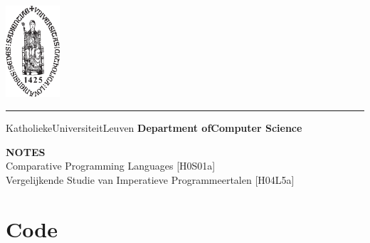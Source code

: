 \documentclass[a4paper]{article}
\begin{document}
\begin{titlepage}
    \newpage
    \thispagestyle{empty}
    \frenchspacing
    \hspace{-0.2cm}
    \includegraphics[height=3.4cm]{assets/sedes}
    \hspace{0.2cm}
    \rule{0.5pt}{3.4cm}
    \hspace{0.2cm}
    \begin{minipage}[b]{8cm}
        \Large{Katholieke\newline Universiteit\newline Leuven}\smallskip\newline
        \large{}\smallskip\newline
        \textbf{Department of\newline Computer Science}\smallskip
    \end{minipage}
    \vspace*{3.2cm}\vfill
    \begin{center}
        \begin{minipage}[t]{\textwidth}
            \begin{center}
                \large{\rm{\textbf{\uppercase{Notes}}}}\\
                \large{\rm{Comparative Programming Languages [H0S01a]}}\\
                \large{\rm{Vergelijkende Studie van Imperatieve Programmeertalen [H04L5a]}}
            \end{center}
        \end{minipage}
    \end{center}
    \vfill
    \hfill{}
\end{titlepage}

\tableofcontents

\newpage

\section{Code}
\end{document}
